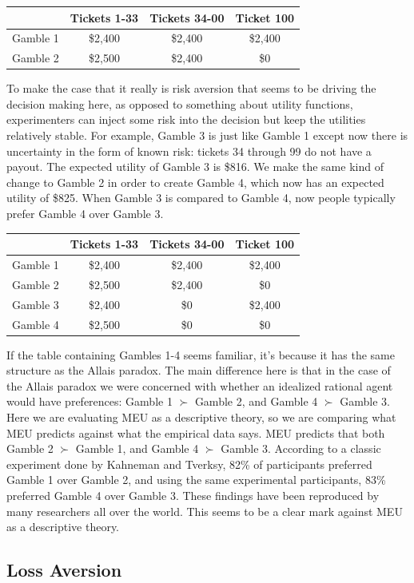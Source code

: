 \documentclass[]{tufte-book}
\begin{document}
\begin{longtable}[]{@{}lccc@{}}
\toprule
& Tickets 1-33 & Tickets 34-00 & Ticket 100\tabularnewline
\midrule
\endhead
Gamble 1 & \$2,400 & \$2,400 & \$2,400\tabularnewline
Gamble 2 & \$2,500 & \$2,400 & \$0\tabularnewline
\bottomrule
\end{longtable}

To make the case that it really is risk aversion that seems to be driving the decision making here, as opposed to something about utility functions, experimenters can inject some risk into the decision but keep the utilities relatively stable. For example, Gamble 3 is just like Gamble 1 except now there is uncertainty in the form of known risk: tickets 34 through 99 do not have a payout. The expected utility of Gamble 3 is \$816. We make the same kind of change to Gamble 2 in order to create Gamble 4, which now has an expected utility of \$825. When Gamble 3 is compared to Gamble 4, now people typically prefer Gamble 4 over Gamble 3.

\begin{longtable}[]{@{}lccc@{}}
\toprule
& Tickets 1-33 & Tickets 34-00 & Ticket 100\tabularnewline
\midrule
\endhead
Gamble 1 & \$2,400 & \$2,400 & \$2,400\tabularnewline
Gamble 2 & \$2,500 & \$2,400 & \$0\tabularnewline
Gamble 3 & \$2,400 & \$0 & \$2,400\tabularnewline
Gamble 4 & \$2,500 & \$0 & \$0\tabularnewline
\bottomrule
\end{longtable}

If the table containing Gambles 1-4 seems familiar, it's because it has the same structure as the Allais paradox. The main difference here is that in the case of the Allais paradox we were concerned with whether an idealized rational agent would have preferences: Gamble 1 \(\succ\) Gamble 2, and Gamble 4 \(\succ\) Gamble 3. Here we are evaluating MEU as a descriptive theory, so we are comparing what MEU predicts against what the empirical data says. MEU predicts that both Gamble 2 \(\succ\) Gamble 1, and Gamble 4 \(\succ\) Gamble 3. According to a classic experiment done by Kahneman and Tverksy, 82\% of participants preferred Gamble 1 over Gamble 2, and using the same experimental participants, 83\% preferred Gamble 4 over Gamble 3. These findings have been reproduced by many researchers all over the world. This seems to be a clear mark against MEU as a descriptive theory.

\hypertarget{loss-aversion}{%
\subsection{Loss Aversion}\label{loss-aversion}}
\end{document}
